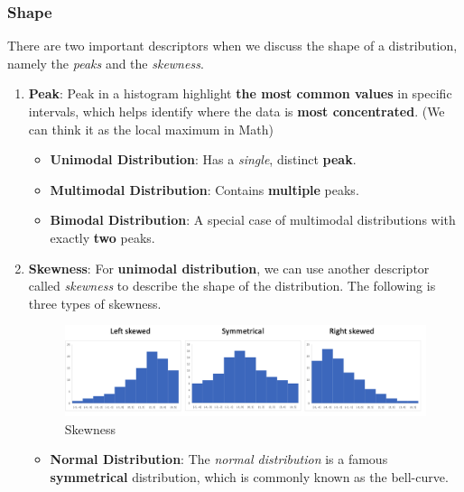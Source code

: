 \documentclass[math,code]{amznotes}
\theoremstyle{remark}
\begin{document}
\subsubsection{Shape}
There are two important descriptors when we discuss the shape of a distribution, namely the \textit{peaks} and the \textit{skewness}.
\begin{enumerate}
    \item \textbf{Peak}: Peak in a histogram highlight \textbf{the most common values} in specific intervals, which helps identify where the data is \textbf{most concentrated}. (We can think it as the local maximum in Math)
    \begin{itemize}
        \item \textbf{Unimodal Distribution}: Has a \textit{single}, distinct \textbf{peak}.
        \item \textbf{Multimodal Distribution}: Contains \textbf{multiple} peaks.
        \item \textbf{Bimodal Distribution}: A special case of multimodal distributions with exactly \textbf{two} peaks.
    \end{itemize}
    \item \textbf{Skewness}: For \textbf{unimodal distribution}, we can use another descriptor called \textit{skewness} to describe the shape of the distribution. The following is three types of skewness. \\
    \begin{figure}[H]
        \centering
        \includegraphics[width=0.65\linewidth]{images/chapter3-skewness.png}
        \caption{Skewness}
        \label{fig:chapter3-skewness}
    \end{figure}
    \begin{itemize}
        \item \textbf{Normal Distribution}: The \textit{normal distribution} is a famous \textbf{symmetrical} distribution, which is commonly known as the bell-curve.
    \end{itemize}
\end{enumerate}
\end{document}

